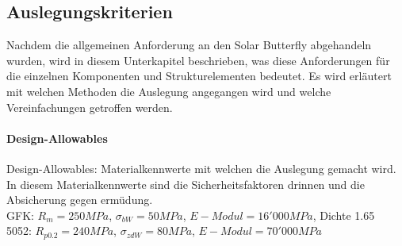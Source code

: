 \subsection{Auslegungskriterien}
Nachdem die allgemeinen Anforderung an den Solar Butterfly abgehandeln wurden, wird in diesem Unterkapitel beschrieben, was diese Anforderungen für die einzelnen Komponenten und Strukturelementen bedeutet. Es wird erläutert mit welchen Methoden die Auslegung angegangen wird und welche Vereinfachungen getroffen werden.\\

\paragraph{Design-Allowables}
Design-Allowables: Materialkennwerte mit welchen die Auslegung gemacht wird.\\
In diesem Materialkennwerte sind die Sicherheitsfaktoren drinnen und die Absicherung gegen ermüdung.\\

GFK: $R_m = 250 MPa$, $\sigma_{bW} = 50 MPa$, $E-Modul = 16'000 MPa$, Dichte 1.65\\
5052: $R_{p0.2} = 240 MPa$, $\sigma_{zdW} = 80 MPa$, $E-Modul = 70'000 MPa$\\


